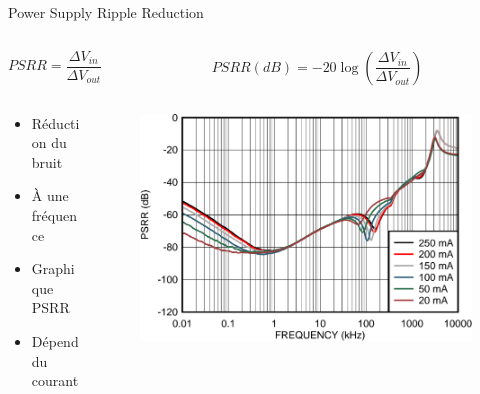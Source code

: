 \begin{frame}{Power Supply Ripple Reduction}
    \begin{columns}
        \begin{column}{0.4\textwidth}
            \begin{center}
                $PSRR = \dfrac{\Delta V_{in}}{\Delta V_{out}}$
            \end{center}
        \end{column}
        \begin{column}{0.5\textwidth}
            \begin{center}
                $PSRR (dB) = -20 \log \left(\dfrac{\Delta V_{in}}{\Delta V_{out}}\right)$
            \end{center}
        \end{column}
    \end{columns}
    \vfill
    \begin{columns}
        \begin{column}{0.3\textwidth}
            \begin{itemize}
                \item Réduction du bruit
                \item À une fréquence
            \end{itemize}
            \pause
            \vspace{12pt}
            \begin{itemize}
                \item Graphique PSRR
                \item Dépend du courant
            \end{itemize}
        \end{column}
        \begin{column}{0.66\textwidth}
            \begin{figure}
                \centering
                \includegraphics[width=\textwidth, height=0.6\textheight, keepaspectratio]{pictures/psrr-graph.png}
            \end{figure}
        \end{column}
    \end{columns}
\end{frame}

